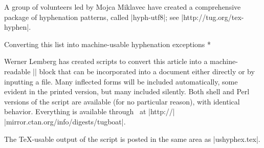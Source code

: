 A group of volunteers led by Mojca Miklavec
have created a comprehensive package of hyphenation patterns, called
|hyph-utf8|; see\newline
|http://tug.org/tex-hyphen|.

\head * Converting this list into machine-usable \break hyphenation exceptions *

Werner Lemberg has created scripts to convert this article into a
machine-readable |\hyphenation| block that can be incorporated into a
document either directly or by inputting a file.  Many inflected forms
will be included automatically, some evident in the printed version, but
many included silently.  Both shell and Perl versions of the script are
available (for no particular reason), with identical behavior.
Everything is available through \CTAN\ at
|http://| |mirror.ctan.org/info/digests/tugboat|.

The \TeX-usable output of the script is posted in the same area as
|ushyphex.tex|.



\def\printhyphens#1{%
 \setbox0\vbox{%
  \pretolerance-1\hyphenpenalty-10000%
  \hsize0pt\leftskip0pt\rightskip0pt\parfillskip0pt%
  \hbadness100\hfuzz\maxdimen
  \offinterlineskip
  \interlinepenalty0\clubpenalty0\widowpenalty0\brokenpenalty0%
  \noindent\hskip0pt #1\par
  \setbox0\lastbox \global\setbox1\hbox{\hbox{\unhbox0}}%
  \loop \unskip \setbox0\lastbox \ifhbox0%
   \global\setbox1\hbox{\hbox{\unhbox0}\discretionary{}{}{}\unhbox1}%
  \repeat}%
}

%
%
%
%
%

